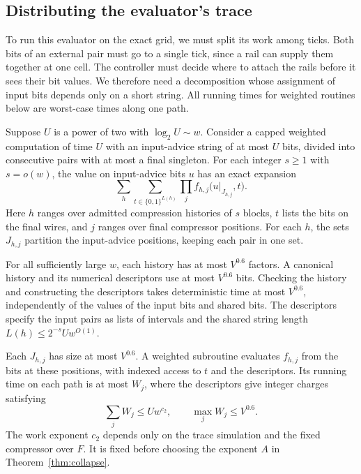 \subsection{Distributing the evaluator's trace}\label{app:trace}

To run this evaluator on the exact grid, we must split its work among
ticks. Both bits of an external pair must go to a single tick, since a
rail can supply them together at one cell. The controller must decide
where to attach the rails before it sees their bit values. We therefore
need a decomposition whose assignment of input bits depends only on a
short string. All running times for weighted routines below are
worst-case times along one path.

\begin{lemma}\label{lem:trace}
Suppose $U$ is a power of two with $\log_2 U\sim w$. Consider a capped
weighted computation of time $U$ with an input-advice string of at most
$U$ bits, divided into consecutive pairs with at most a final singleton.
For each integer $s\ge1$ with $s=o(w)$, the value on input-advice bits
$u$ has an exact expansion
\[
       \sum_h\sum_{t\in\{0,1\}^{L(h)}} \prod_j f_{h,j}\bigl(u|_{J_{h,j}},t\bigr).
\]
Here $h$ ranges over admitted compression histories of $s$ blocks, $t$
lists the bits on the final wires, and $j$ ranges over final compressor
positions. For each $h$, the sets $J_{h,j}$ partition the input-advice
positions, keeping each pair in one set.

For all sufficiently large $w$, each history has at most $V^{0.6}$ factors.
A canonical history and its numerical descriptors use at most $V^{0.6}$
bits. Checking the history and constructing the descriptors takes
deterministic time at most $V^{0.6}$, independently of the values of the
input bits and shared bits. The descriptors specify the input pairs as
lists of intervals and the shared string length $L(h)\le 2^{-s}U w^{O(1)}$.

Each $J_{h,j}$ has size at most $V^{0.6}$. A weighted subroutine evaluates
$f_{h,j}$ from the bits at these positions, with indexed access to $t$
and the descriptors. Its running time on each path is at most $W_j$, where the
descriptors give integer charges satisfying
\[
                  \sum_j W_j\le U w^{c_2},
                  \qquad \max_j W_j\le V^{0.6}.
\]
The work exponent $c_2$ depends only on the trace simulation and the
fixed compressor over $F$. It is fixed before choosing the exponent
$A$ in Theorem~\ref{thm:collapse}.
\end{lemma}

